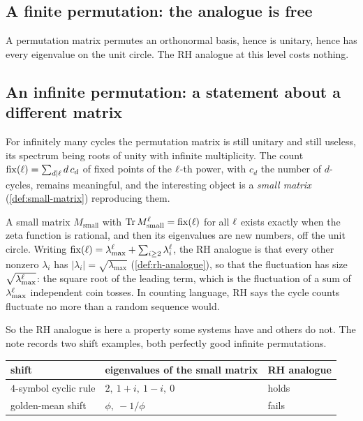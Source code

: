 \subsection{A finite permutation: the analogue is free}

\begin{observation}
\label{obs:rh-finite-permutation}
A permutation matrix permutes an orthonormal basis, hence is unitary, hence has every
eigenvalue on the unit circle. The RH analogue at this level costs nothing.
\end{observation}

\subsection{An infinite permutation: a statement about a different matrix}

For infinitely many cycles the permutation matrix is still unitary and still useless,
its spectrum being roots of unity with infinite multiplicity. The count
$\operatorname{fix}(\ell) = \sum_{d\mid\ell}d\,c_d$ of fixed points of the $\ell$-th
power, with $c_d$ the number of $d$-cycles, remains meaningful, and the
interesting object is a \emph{small matrix} (\cref{def:small-matrix}) reproducing
them.

\begin{observation}
\label{obs:rh-small-matrix}
A small matrix $M_{\mathrm{small}}$ with $\operatorname{Tr} M_{\mathrm{small}}^{\ell} =
\operatorname{fix}(\ell)$ for all $\ell$ exists exactly when the zeta function is
rational, and then its eigenvalues are new numbers, off the unit circle. Writing
$\operatorname{fix}(\ell) = \lambda_{\max}^{\ell} + \sum_{i\ge2}\lambda_i^{\ell}$,
the RH analogue is that every other nonzero $\lambda_i$ has $|\lambda_i| =
\sqrt{\lambda_{\max}}$ (\cref{def:rh-analogue}), so that the fluctuation has size
$\sqrt{\lambda_{\max}^{\ell}}$: the square root of the leading term, which is the
fluctuation of a sum of $\lambda_{\max}^{\ell}$ independent coin tosses. In counting
language, RH says the cycle counts fluctuate no more than a random sequence would.
\end{observation}

So the RH analogue is here a property some systems have and others do not. The note
records two shift examples, both perfectly good infinite permutations.

\begin{center}
\begin{tabular}{@{}lll@{}}
\toprule
shift & eigenvalues of the small matrix & RH analogue \\
\midrule
$4$-symbol cyclic rule & $2,\ 1+i,\ 1-i,\ 0$ & holds \\
golden-mean shift & $\phi,\ -1/\phi$ & fails \\
\bottomrule
\end{tabular}
\end{center}

